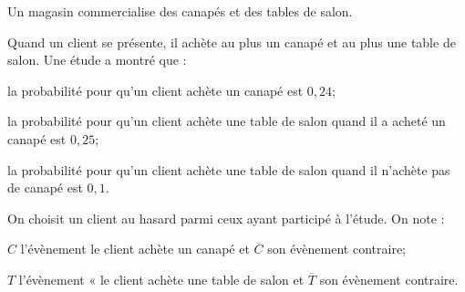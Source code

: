 \bigskip

Un magasin commercialise des canapés et des tables de salon.

Quand un client se présente, il achète au plus un canapé et au plus une table de salon. Une étude a montré que :

\begin{list}{\textbullet}{}
\item la probabilité pour qu'un client achète un canapé est $0,24$;
\item la probabilité pour qu'un client achète une table de salon quand il a acheté un canapé est $0,25$;
\item la probabilité pour qu'un client achète une table de salon quand il n'achète pas de canapé est $0,1$.
\end{list}

On choisit un client au hasard parmi ceux ayant participé à l'étude. On note :

\begin{list}{\textbullet}{}
\item $C$ l'évènement \og le client achète un canapé \fg{} et $\overline{C}$ son évènement contraire;
\item $T$ l'évènement « le client achète une table de salon \fg{} et $\overline{T}$ son évènement contraire.
\end{list}

